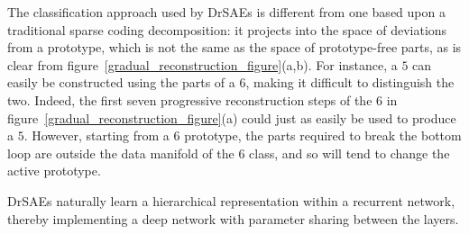 \documentclass{article} %
\begin{document}
The classification approach used by DrSAEs is different from one based upon a traditional sparse coding decomposition: it projects into the space of deviations from a prototype, which is not the same as the space of prototype-free parts, as is clear from figure~\ref{gradual_reconstruction_figure}(a,b).  For instance, a $5$ can easily be constructed using the parts of a $6$, making it difficult to distinguish the two.  Indeed, the first seven progressive reconstruction steps of the $6$ in figure~\ref{gradual_reconstruction_figure}(a) could just as easily be used to produce a $5$.  However, starting from a $6$ prototype, the parts required to break the bottom loop are outside the data manifold of the $6$ class, and so will tend to change the active prototype.  

DrSAEs naturally learn a hierarchical representation within a recurrent network, thereby implementing a deep network with parameter sharing between the layers.




\end{document}
